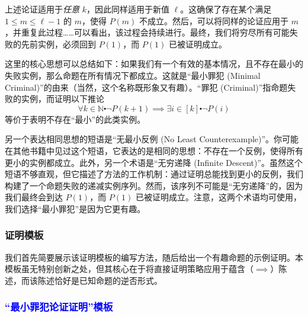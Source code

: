 上述论证适用于\emph{任意} $k$，因此同样适用于新值 $\ell$。这确保了存在某个满足 $1 \le m \le \ell-1$ 的 $m$，使得 $P(m)$ 不成立。然后，可以将同样的论证应用于 $m$，并重复此过程……可以看出，该过程会持续进行。最终，我们将穷尽所有可能失败的先前实例，必须回到 $P(1)$，而 $P(1)$ 已被证明成立。

这里的核心思想可以总结如下：如果我们有一个有效的基本情况，且不存在最小的失败实例，那么命题在所有情况下都成立。这就是``最小罪犯 (Minimal Criminal)''的由来（当然，这个名称既形象又有趣）。``罪犯 (Criminal)''指命题失败的实例，而证明以下推论
\[\forall k \in \mathbb{N} \centerdot \neg P(k+1) \implies \exists i \in [k] \centerdot \neg P(i)\]
等价于表明不存在``最小''的此类实例。

另一个表达相同思想的短语是``无最小反例 (No Least Counterexample)''。你可能在其他书籍中见过这个短语，它表达的是相同的思想：不存在一个反例，使得所有更小的实例都成立。此外，另一个术语是``无穷递降 (Infinite Descent)''。虽然这个短语不够直观，但它描述了方法的工作机制：通过证明总能找到更小的反例，我们构建了一个命题失败的递减实例序列。然而，该序列不可能是``无穷递降''的，因为我们最终会到达 $P(1)$，而 $P(1)$ 已被证明成立。注意，这两个术语均可使用，我们选择``最小罪犯''是因为它更有趣。

\subsubsection*{证明模板}

我们首先简要展示该证明模板的编写方法，随后给出一个有趣命题的示例证明。本模板虽无特别创新之处，但其核心在于将直接证明策略应用于蕴含（$\implies$）陈述，而该陈述恰好是已知命题的逆否形式。

\subsubsection*{\textcolor{blue}{``最小罪犯论证证明''模板}}

\setlength{\fboxrule}{2pt}
\setlength\fboxsep{5mm}
\begin{center}
\noindent {}
\end{center}

